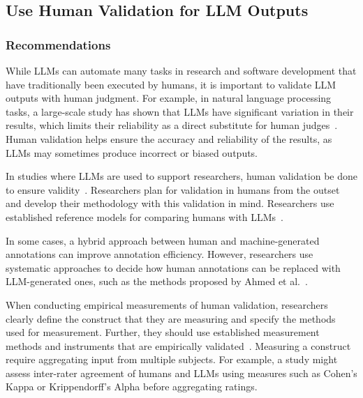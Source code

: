 



\subsection{Use Human Validation for LLM Outputs}

\subsubsection{Recommendations}


While LLMs can automate many tasks in research and software development that have traditionally been executed by humans, it is important to validate LLM outputs with human judgment.
For example, in natural language processing tasks, a large-scale study has shown that LLMs have significant variation in their results, which limits their reliability as a direct substitute for human judges~\cite{DBLP:journals/corr/abs-2406-18403}. 
Human validation helps ensure the accuracy and reliability of the results, as LLMs may sometimes produce incorrect or biased outputs.

In studies where LLMs are used to support researchers, human validation \must be done to ensure validity~\cite{DBLP:conf/chi/Wang0RMM24}.
Researchers \should plan for validation in humans from the outset and develop their methodology with this validation in mind.
Researchers \should use established reference models for comparing humans with LLMs~\cite{Schneider2025ReferenceModel}.

In some cases, a hybrid approach between human and machine-generated annotations can improve annotation efficiency.
However, researchers \should use systematic approaches to decide how human annotations can be replaced with LLM-generated ones, such as the methods proposed by Ahmed et al.~\cite{DBLP:journals/corr/abs-2408-05534}.

When conducting empirical measurements of human validation, researchers \must clearly define the construct that they are measuring and \must specify the methods used for measurement. 
Further, they should use established measurement methods and instruments that are empirically validated~\cite{DBLP:journals/fcomp/HoffmanMKL23, DBLP:conf/chi/PerrigSB23}.
Measuring a construct \may require aggregating input from multiple subjects. 
For example, a study might assess inter-rater agreement of humans and LLMs using measures such as Cohen's Kappa or Krippendorff's Alpha before aggregating ratings.

